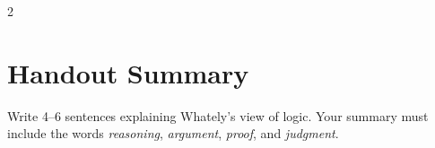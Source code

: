 \documentclass[12pt]{article}
\begin{document}
\begin{multicols}{2}
\section*{Handout Summary}
Write 4--6 sentences explaining Whately's view of logic. Your summary must include the words \textit{reasoning}, \textit{argument}, \textit{proof}, and \textit{judgment}.
\end{multicols}
\end{document}
